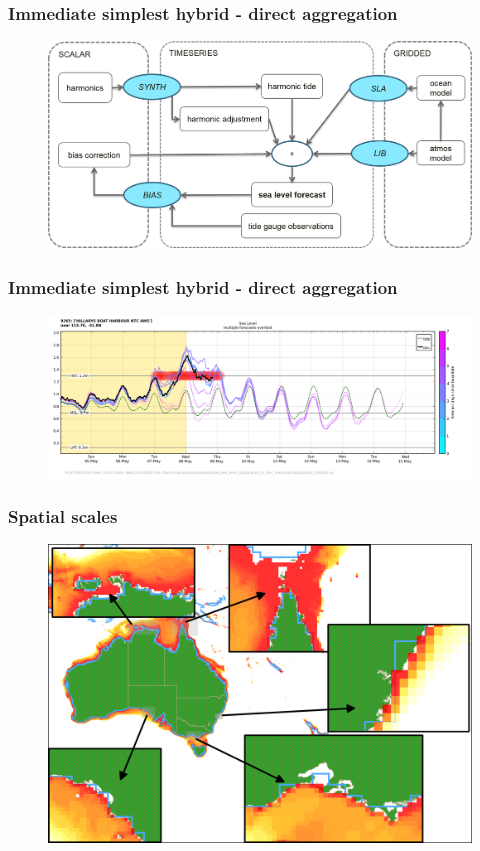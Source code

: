 \begin{frame}
\frametitle{Immediate simplest hybrid - direct aggregation}
    \begin{figure}      
    \includegraphics[width=\textwidth]{figures/diagrams/aggSL_schematic_abstract.png}
    \end{figure}
\end{frame}
\begin{frame}
\frametitle{Immediate simplest hybrid - direct aggregation}
    \begin{figure}      
    \includegraphics[width=\textwidth]{figures/plots/aggregate_fc_plot_009265.png}
    \end{figure}
\end{frame}
\begin{frame}
\frametitle{Spatial scales}
    \begin{figure}      
    \includegraphics[width=\textwidth]{figures/maps/omaps_masks.png}
    \end{figure}
\end{frame}
